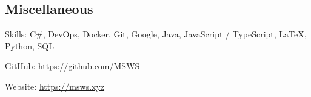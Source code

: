 \documentclass[10pt,letterpaper]{article}
\newenvironment{indentsection}[1]%
{\begin{list}{}%
	{\setlength{\leftmargin}{#1}}%
	\item[]%
}
{\end{list}}
\begin{document}

\subsection*{Miscellaneous}

\begin{indentsection}{\parindent}
    \begin{description*}
        \item[Skills:]
              C\#, DevOps, Docker, Git, Google, Java, JavaScript / TypeScript, \LaTeX, Python, SQL
        \item[GitHub:] \href{https://github.com/MSWS}{https://github.com/MSWS}
        \item[Website:] \href{https://msws.xyz}{https://msws.xyz}
    \end{description*}
\end{indentsection}
\end{document}
